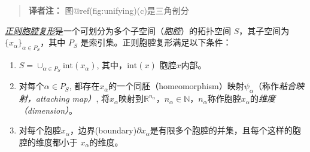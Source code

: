 \documentclass[
  12pt,
]{krantz}
\providecommand{\tightlist}{%
  \setlength{\itemsep}{0pt}\setlength{\parskip}{0pt}}
\begin{document}
\begin{glossarybox}

\begin{quote}
\textbf{译者注：} 图@ref(fig:unifying)(c)是三角剖分
\end{quote}

\end{glossarybox}

\label{rccmain}
\href{https://app.vectary.com/p/3EBiRiJcYjFNvkbbWszQ0Z}{\emph{正则胞腔复形}}是一个可划分为多个子空间（\emph{胞腔}）的拓扑空间
\(S\)，其子空间为 \(\{x_\alpha\}_{\alpha \in P_{S} }\)，其中 \(P_{S}\)
是索引集。正则胞腔复形满足以下条件：

\begin{enumerate}
\def\labelenumi{\arabic{enumi}.}
\tightlist
\item
  \(S= \cup_{\alpha \in P_{S}} \mbox{int}(x_{\alpha})\),
  其中，\(\mbox{int}(x)\) 胞腔\(x\)内部。
\item
  对每个\(\alpha \in P_S\),
  都存在\(x_\alpha\)的一个同胚（homeomorphism）映射\(\psi_{\alpha}\)（称作\emph{粘合映射，attaching
  map）},
  将\(x_\alpha\)映射到\(\mathbb{R}^{n_\alpha}\)，\(n_\alpha\in \mathbb{N}\)，\(n_\alpha\)称作胞腔\(x_\alpha\)的\emph{维度（dimension）}。
\item
  对每个胞腔\(x_\alpha\)，边界(boundary)\(\partial x_{\alpha}\)是有限多个胞腔的并集，且每个这样的胞腔的维度都小于
  \(x_\alpha\)的维度。
\end{enumerate}
\end{document}
